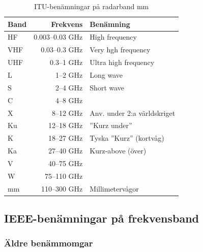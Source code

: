 \begin{table}[H]
\centering

\begin{tabular}{lrl}
	\textbf{Band} & \textbf{Frekvens} & \textbf{Benämning}          \\ \hline
	HF            &   0.003--0.03 GHz & High frequency              \\
	VHF           &     0.03--0.3 GHz & Very hgh frequency          \\
	UHF           &        0.3--1 GHz & Ultra high frequency        \\
	L             &          1--2 GHz & Long wave                   \\
	S             &          2--4 GHz & Short wave                  \\
	C             &          4--8 GHz &  \\
	X             &         8--12 GHz & Anv. under 2:a världskriget \\
	Ku            &        12--18 GHz & ''Kurz under''              \\
	K             &        18--27 GHz & Tyska ''Kurz'' (kortvåg)    \\
	Ka            &        27--40 GHz & Kurz-above (över)           \\
	V             &        40--75 GHz &  \\
	W             &       75--110 GHz &  \\
	mm            &      110--300 GHz & Millimetervågor
\end{tabular}
\caption{ITU-benämningar på radarband mm}
\end{table}

\subsection{IEEE-benämningar på frekvensband}
\label{sec:IEEE-benamningar}

\subsubsection{Äldre benämmomgar}


